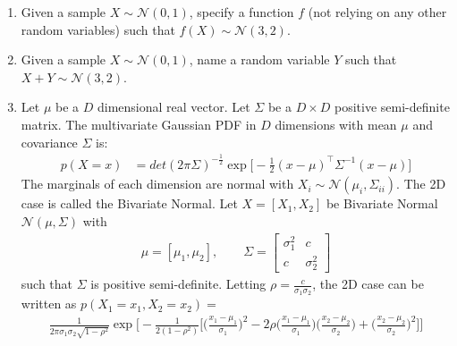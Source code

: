 \documentclass[11pt]{article}
\begin{document}
   \begin{enumerate}[label=(\Alph*)]
   
   
        \item Given a sample $X \sim \mathcal{N}(0,1)$, specify a function $f$ (not relying on any other random variables) such that $f(X) \sim \mathcal{N}(3,2)$.


        \item Given a sample $X \sim \mathcal{N}(0,1)$, name a random variable $Y$ such that $X+Y \sim \mathcal{N}(3,2)$.
        
            
        \item 
           Let $\mu$ be a $D$ dimensional real vector.
           Let $\Sigma$ be a $D \times D$ positive semi-definite matrix.
           The multivariate Gaussian PDF in $D$ dimensions with mean $\mu$ and covariance $\Sigma$ is:
                    \begin{align*}
                p(X=x) &= det(2 \pi \Sigma)^{-\frac{1}{2}} \exp\Big[-\frac{1}{2}(x - \mu)^\top \Sigma^{-1}(x - \mu) \Big]
                    \end{align*}
                    The marginals of each dimension are normal with $X_i \sim \mathcal{N}(\mu_i, \Sigma_{ii})$.
                    The 2D case is called the Bivariate Normal.
                Let $X=[X_1,X_2]$ be Bivariate Normal
                $\mathcal{N}(\mu,\Sigma)$ with
                \begin{align*}
                    \mu = [\mu_1,\mu_2], \quad \quad 
                    \Sigma =  
                    \begin{bmatrix}
                        \sigma_1^2 & c\\
                        c & \sigma_2^2
                    \end{bmatrix}
                \end{align*}
            such that $\Sigma$ is positive semi-definite.
            Letting $\rho=\frac{c}{\sigma_1 \sigma_2}$, the 2D case can be written as
            $p(X_1=x_1,X_2=x_2)=$ 
                    \begin{align*}
                \frac{1}{2 \pi \sigma_1 \sigma_2 \sqrt{1-\rho^2}} 
               \exp \Bigg[
               - \frac{1}{2(1-\rho^2)}
               \Big[ \Big(\frac{x_1-\mu_1}{\sigma_1} \Big)^2 - 2 \rho \Big(\frac{x_1-\mu_1}{\sigma_1}\Big)\Big(\frac{x_2-\mu_2}{\sigma_2}\Big) + \Big(\frac{x_2 - \mu_2}{\sigma_2}\Big)^2 
               \Big]
               \Bigg]
            \end{align*}
            

\end{enumerate}
\end{document}
